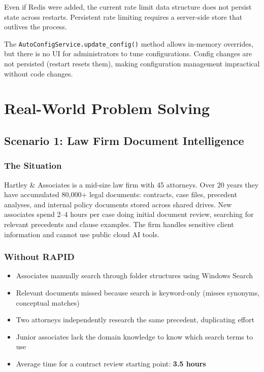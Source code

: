 \documentclass[12pt, a4paper, oneside]{report}
\newcommand{\kw}[1]{\texttt{\small #1}}
\begin{document}
\begin{conbox}
Even if Redis were added, the current rate limit data structure does not persist state
across restarts. Persistent rate limiting requires a server-side store that outlives
the process.
\end{conbox}

\begin{conbox}
The \kw{AutoConfigService.update\_config()} method allows in-memory overrides, but there
is no UI for administrators to tune configurations. Config changes are not persisted
(restart resets them), making configuration management impractical without code changes.
\end{conbox}

\chapter{Real-World Problem Solving}

\section{Scenario 1: Law Firm Document Intelligence}

\subsection*{The Situation}
Hartley \& Associates is a mid-size law firm with 45 attorneys. Over 20 years they have
accumulated 80,000+ legal documents: contracts, case files, precedent analyses, and internal
policy documents stored across shared drives. New associates spend 2--4 hours per case doing
initial document review, searching for relevant precedents and clause examples. The firm
handles sensitive client information and cannot use public cloud AI tools.

\subsection*{Without RAPID}
\begin{itemize}
  \item Associates manually search through folder structures using Windows Search
  \item Relevant documents missed because search is keyword-only (misses synonyms, conceptual matches)
  \item Two attorneys independently research the same precedent, duplicating effort
  \item Junior associates lack the domain knowledge to know which search terms to use
  \item Average time for a contract review starting point: \textbf{3.5 hours}
\end{itemize}
\end{document}
